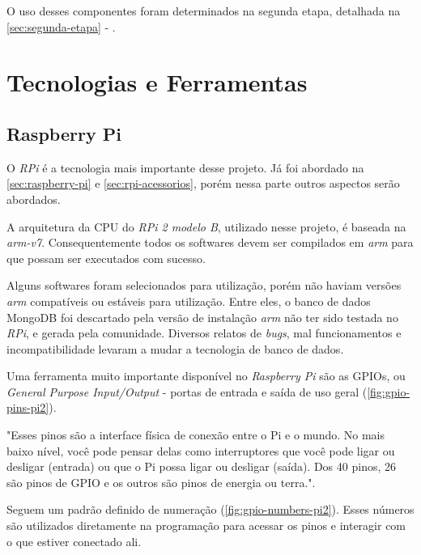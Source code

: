 O uso desses componentes foram determinados na segunda etapa, detalhada na \autoref{sec:segunda-etapa} - .


\section{Tecnologias e Ferramentas}\label{sec:tecnologias-ferramentas}


\subsection{Raspberry Pi}\label{sec:rpi-tecnologia}

O \textit{RPi} é a tecnologia mais importante desse projeto. Já foi abordado na \autoref{sec:raspberry-pi} e \autoref{sec:rpi-acessorios}, porém nessa parte outros aspectos serão abordados.

A arquitetura da CPU do \textit{RPi 2 modelo B}, utilizado nesse projeto, é baseada na \textit{arm-v7}. Consequentemente todos os softwares devem ser compilados em \textit{arm} para que possam ser executados com sucesso. 

Alguns softwares foram selecionados para utilização, porém não haviam versões \textit{arm} compatíveis ou estáveis para utilização. Entre eles, o banco de dados MongoDB foi descartado pela versão de instalação \textit{arm} não ter sido testada no \textit{RPi}, e gerada pela comunidade. Diversos relatos de \textit{bugs}, mal funcionamentos e incompatibilidade levaram a mudar a tecnologia de banco de dados.

Uma ferramenta muito importante disponível no \textit{Raspberry Pi} são as GPIOs, ou \textit{General Purpose Input/Output} - portas de entrada e saída de uso geral (\autoref{fig:gpio-pins-pi2}).  

\begin{citacao}
"Esses pinos são a interface física de conexão entre o Pi e o mundo. No mais baixo nível, você pode pensar delas como interruptores que você pode ligar ou desligar (entrada) ou que o Pi possa ligar ou desligar (saída). Dos 40 pinos, 26 são pinos de GPIO e os outros são pinos de energia ou terra.". \cite{rpi-gpio}
\end{citacao}

Seguem um padrão definido de numeração (\autoref{fig:gpio-numbers-pi2}). Esses números são utilizados diretamente na programação para acessar os pinos e interagir com o que estiver conectado ali.

